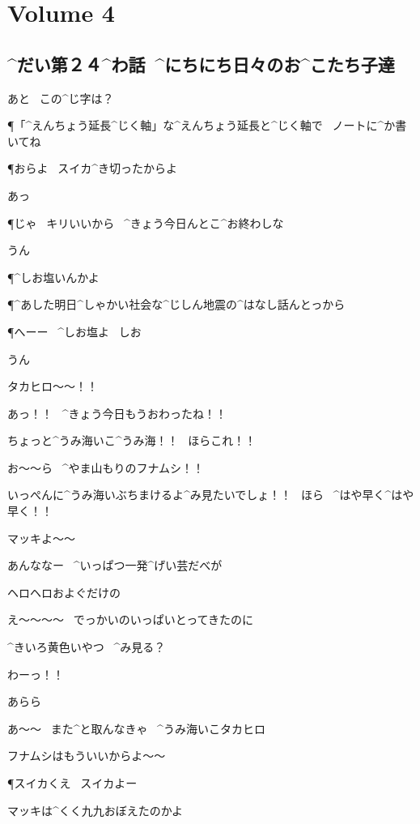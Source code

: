 \section{Volume 4}

\subsection{^{だい}{第}２４^{わ}{話}\ ^{にちにち}{日々}のお^{こたち}{子達}}

\page[4]
\T あと
\ この^{じ}{字}は？

\P 「^{えんちょう}{延長}^{じく}{軸}」な^{えんちょう}{延長}と^{じく}{軸}で
\ ノートに^{か}{書}いてね

\P おらよ
\ スイカ^{き}{切}ったからよ

\T あっ

\page
\P じゃ
\ キリいいから
\ ^{きょう}{今日}んとこ^{お}{終}わしな

\T うん

\P ^{しお}{塩}いんかよ

\P ^{あした}{明日}^{しゃかい}{社会}な^{じしん}{地震}の^{はなし}{話}んとっから

\P へーー
\ ^{しお}{塩}よ
\ しお

\T うん

\page
\M タカヒロ〜〜！！

\M あっ！！
\ ^{きょう}{今日}もうおわったね！！

\M ちょっと^{うみ}{海}いこ^{うみ}{海}！！
\ ほらこれ！！

\page
\M お〜〜ら
\ ^{やま}{山}もりのフナムシ！！

\M いっぺんに^{うみ}{海}いぶちまけるよ^{み}{見}たいでしょ！！
\ ほら
\ ^{はや}{早}く^{はや}{早}く！！

\T マッキよ〜〜

\T あんななー
\ ^{いっぱつ}{一発}^{げい}{芸}だべが

\T ヘロヘロおよぐだけの

\M え〜〜〜〜
\ でっかいのいっぱいとってきたのに

\M ^{きいろ}{黄色}いやつ
\ ^{み}{見}る？

\page
\T わーっ！！

\M あらら

\page
\M あ〜〜
\ また^{と}{取}んなきゃ
\ ^{うみ}{海}いこタカヒロ

\T フナムシはもういいからよ〜〜

\P スイカくえ
\ スイカよー

\T マッキは^{くく}{九九}おぼえたのかよ

